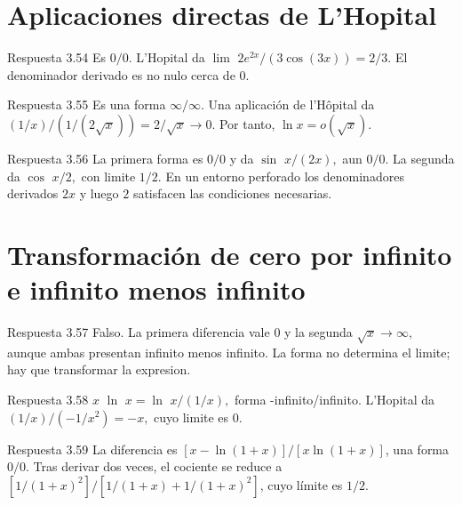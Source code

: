 \documentclass[10pt,a4paper,oneside,openany]{book}
\begin{document}
\section{Aplicaciones directas de L'Hopital}
\begin{PSevenAnswerFixed}{Respuesta 3.54}
Es \(0/0\). L'Hopital da \(\lim\) \(2e^{2x}/(3\cos(3x))=2/3\). El denominador derivado es no nulo cerca de \(0\).
\end{PSevenAnswerFixed}
\begin{PSevenAnswerFixed}{Respuesta 3.55}
Es una forma \(\infty/\infty\). Una aplicación de l'Hôpital da \((1/x)/(1/(2\sqrt{x}))=2/\sqrt{x}\to0\). Por tanto, \(\ln x=o(\sqrt{x})\).
\end{PSevenAnswerFixed}
\begin{PSevenAnswerFixed}{Respuesta 3.56}
La primera forma es \(0/0\) y da \(\sin\) \(x/(2x),\) aun \(0/0\). La segunda da \(\cos\) \(x/2,\) con limite \(1/2\). En un entorno perforado los denominadores derivados \(2x\) y luego \(2\) satisfacen las condiciones necesarias.
\end{PSevenAnswerFixed}
\section{Transformación de cero por infinito e infinito menos infinito}
\begin{PSevenAnswerFixed}{Respuesta 3.57}
Falso. La primera diferencia vale \(0\) y la segunda \(\sqrt{x}\to \infty ,\) aunque ambas presentan infinito menos infinito. La forma no determina el limite; hay que transformar la expresion.
\end{PSevenAnswerFixed}
\begin{PSevenAnswerFixed}{Respuesta 3.58}
\(x\) \(\ln\) \(x=\ln\) \(x/(1/x),\) forma -infinito/infinito. L'Hopital da \((1/x)/(-1/x^{2})=-x,\) cuyo limite es \(0\).
\end{PSevenAnswerFixed}
\begin{PSevenAnswerFixed}{Respuesta 3.59}
La diferencia es \([x-\ln(1+x)]/[x\ln(1+x)]\), una forma \(0/0\). Tras derivar dos veces, el cociente se reduce a \([1/(1+x)^2]/[1/(1+x)+1/(1+x)^2]\), cuyo límite es \(1/2\).
\end{PSevenAnswerFixed}
\end{document}

